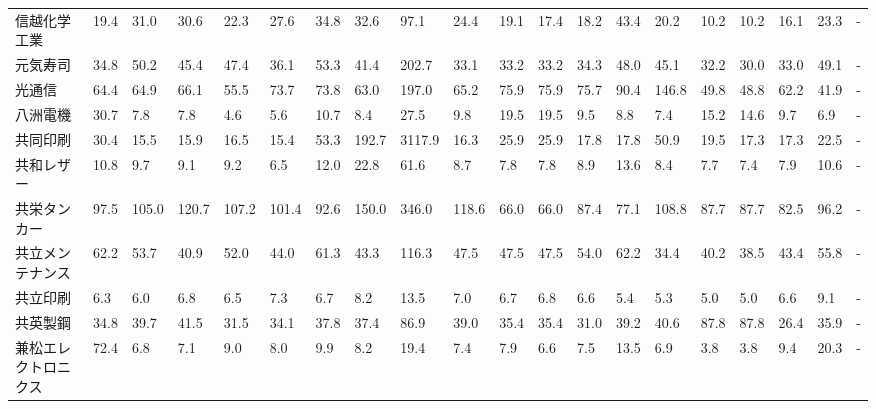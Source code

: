 \begin{longtable}[c]{lp{3mm}p{3mm}p{3mm}p{3mm}p{3mm}p{3mm}p{3mm}p{3mm}p{3mm}p{3mm}p{3mm}p{3mm}p{3mm}p{3mm}p{3mm}p{3mm}p{3mm}p{3mm}p{3mm}}
信越化学工業          &   19.4 &   31.0 &      30.6 &      22.3 &       27.6 &    34.8 &    32.6 &     97.1 &    24.4 &    19.1 &   17.4 &   18.2 &    43.4 &    20.2 &    10.2 &   10.2 &   16.1 &    23.3 &      - \\
元気寿司            &   34.8 &   50.2 &      45.4 &      47.4 &       36.1 &    53.3 &    41.4 &    202.7 &    33.1 &    33.2 &   33.2 &   34.3 &    48.0 &    45.1 &    32.2 &   30.0 &   33.0 &    49.1 &      - \\
光通信             &   64.4 &   64.9 &      66.1 &      55.5 &       73.7 &    73.8 &    63.0 &    197.0 &    65.2 &    75.9 &   75.9 &   75.7 &    90.4 &   146.8 &    49.8 &   48.8 &   62.2 &    41.9 &      - \\
八洲電機            &   30.7 &    7.8 &       7.8 &       4.6 &        5.6 &    10.7 &     8.4 &     27.5 &     9.8 &    19.5 &   19.5 &    9.5 &     8.8 &     7.4 &    15.2 &   14.6 &    9.7 &     6.9 &      - \\
共同印刷            &   30.4 &   15.5 &      15.9 &      16.5 &       15.4 &    53.3 &   192.7 &   3117.9 &    16.3 &    25.9 &   25.9 &   17.8 &    17.8 &    50.9 &    19.5 &   17.3 &   17.3 &    22.5 &      - \\
共和レザー           &   10.8 &    9.7 &       9.1 &       9.2 &        6.5 &    12.0 &    22.8 &     61.6 &     8.7 &     7.8 &    7.8 &    8.9 &    13.6 &     8.4 &     7.7 &    7.4 &    7.9 &    10.6 &      - \\
共栄タンカー          &   97.5 &  105.0 &     120.7 &     107.2 &      101.4 &    92.6 &   150.0 &    346.0 &   118.6 &    66.0 &   66.0 &   87.4 &    77.1 &   108.8 &    87.7 &   87.7 &   82.5 &    96.2 &      - \\
共立メンテナンス        &   62.2 &   53.7 &      40.9 &      52.0 &       44.0 &    61.3 &    43.3 &    116.3 &    47.5 &    47.5 &   47.5 &   54.0 &    62.2 &    34.4 &    40.2 &   38.5 &   43.4 &    55.8 &      - \\
共立印刷            &    6.3 &    6.0 &       6.8 &       6.5 &        7.3 &     6.7 &     8.2 &     13.5 &     7.0 &     6.7 &    6.8 &    6.6 &     5.4 &     5.3 &     5.0 &    5.0 &    6.6 &     9.1 &      - \\
共英製鋼            &   34.8 &   39.7 &      41.5 &      31.5 &       34.1 &    37.8 &    37.4 &     86.9 &    39.0 &    35.4 &   35.4 &   31.0 &    39.2 &    40.6 &    87.8 &   87.8 &   26.4 &    35.9 &      - \\
兼松エレクトロニクス      &   72.4 &    6.8 &       7.1 &       9.0 &        8.0 &     9.9 &     8.2 &     19.4 &     7.4 &     7.9 &    6.6 &    7.5 &    13.5 &     6.9 &     3.8 &    3.8 &    9.4 &    20.3 &      - \\

\end{longtable}
